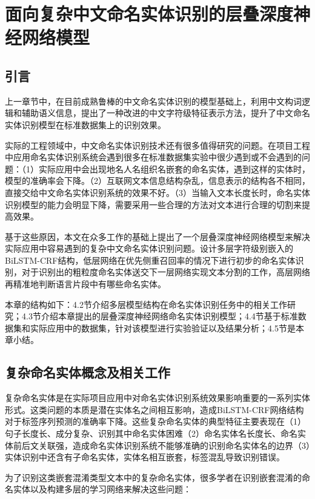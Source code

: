 \documentclass[winfonts,master,oneside,nobackinfo]{njuthesis}
\begin{document}
\chapter{面向复杂中文命名实体识别的层叠深度神经网络模型}

\section{引言}

上一章节中，在目前成熟鲁棒的中文命名实体识别的模型基础上，利用中文构词逻辑和辅助语义信息，提出了一种改进的中文字符级特征表示方法，提升了中文命名实体识别模型在标准数据集上的识别效果。

实际的工程领域中，中文命名实体识别技术还有很多值得研究的问题。在项目工程中应用命名实体识别系统会遇到很多在标准数据集实验中很少遇到或不会遇到的问题：（1）实际应用中会出现地名人名组织名嵌套的命名实体，遇到这样的实体时，模型的准确率会下降。（2）互联网文本信息结构杂乱，信息表示的结构各不相同，直接交给中文命名实体识别系统的效果不好。（3）当输入文本长度长时，命名实体识别模型的能力会明显下降，需要采用一些合理的方法对文本进行合理的切割来提高效果。

基于这些原因，本文在众多工作的基础上提出了一个层叠深度神经网络模型来解决实际应用中容易遇到的复杂中文命名实体识别问题。设计多层字符级别嵌入的BiLSTM-CRF结构，低层网络在优先侧重召回率的情况下进行初步的命名实体识别，对于识别出的粗粒度命名实体送交下一层网络实现文本分割的工作，高层网络再精准地判断语言片段中有哪些命名实体。

本章的结构如下：4.2节介绍多层模型结构在命名实体识别任务中的相关工作研究；4.3节介绍本章提出的层叠深度神经网络命名实体识别模型；4.4节基于标准数据集和实际应用中的数据集，针对该模型进行实验验证以及结果分析；4.5节是本章小结。





\section{复杂命名实体概念及相关工作}

复杂命名实体是在实际项目应用中对命名实体识别系统效果影响重要的一系列实体形式。这类问题的本质是潜在实体名之间相互影响，造成BiLSTM-CRF网络结构对于标签序列预测的准确率下降。这些复杂命名实体的典型特征主要表现在（1）句子长度长、成分复杂、识别其中命名实体困难（2）命名实体名长度长、命名实体前后文关联强，造成命名实体识别系统不能够准确的识别命名实体名的边界（3）实体识别中还含有子命名实体，实体名相互嵌套，标签混乱导致识别错误。

为了识别这类嵌套混淆类型文本中的复杂命名实体，很多学者在识别嵌套混淆的命名实体以及构建多层的学习网络来解决这些问题：
\end{document}
